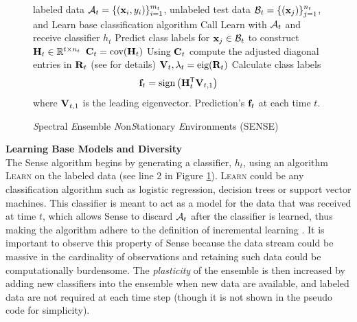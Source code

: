 \documentclass[10pt, conference]{IEEEtran}
\begin{document}
\begin{figure}
  \centering
  \begin{framed}\small
    \begin{algorithmic}[1]
      \INPUT labeled data ${\mathcal A}_t=\{\left({\mathbf x}_i,y_i\right)\}_{i=1}^{m_t}$,
        unlabeled test data ${\mathcal B}_t=\{\left({\mathbf x}_j\right)\}_{j=1}^{n_t}$, and 
        {\sc Learn} base classification algorithm
      \vspace{1em}
	    \STATE Call {\sc Learn} with ${\mathcal A}_t$ and receive classifier  $h_t$
        \STATE Predict class labels for ${\mathbf x}_j\in{\mathcal B}_t$ to construct ${\mathbf H}_t \in {\mathbb R}^{t \times n_t}$
        \STATE ${\mathbf C}_t = \textrm{cov}({\mathbf H}_t)$
        \STATE Using ${\mathbf C}_t$  compute the adjusted diagonal entries in ${\mathbf R}_t$ (see \cite{Parisi2014PNAS} for details)
        \STATE ${\mathbf V}_t,\lambda_t = \textrm{eig}({\mathbf R}_t)$
        \STATE Calculate class labels 
          \begin{equation}
            \label{eq:weight votes}
            \fbf_t = \textrm{sign}\left(\Hbf_t^\T\Vbf_{t,1}\right)
          \end{equation}
          where ${\mathbf V}_{t,1}$ is the leading eigenvector. 
	  \ENDFOR
	  \OUTPUT Prediction's ${\mathbf f}_t$ at each time $t$.
    \end{algorithmic}
  \end{framed}
  \caption{{\em S}pectral {\em E}nsemble {\em N}on{\em S}tationary {\em E}nvironments (SENSE)}
  \label{alg:transe}
\end{figure}

{\bf\noindent Learning Base Models and Diversity}\\
The Sense algorithm begins by generating a classifier, $h_t$, using an algorithm \textsc{Learn} on the labeled data (see line 2 in Figure \ref{alg:transe}). \textsc{Learn} could be any classification algorithm such as logistic regression, decision trees or support vector machines. This classifier is meant to act as a model for the data that was received at time $t$, which allows Sense to discard ${\mathcal A}_t$ after the classifier is learned, thus making the algorithm adhere to the definition of incremental learning \cite{Polikar2001TSMC}. It is important to observe this property of Sense because the data stream could be massive in the cardinality of observations and retaining such data could be computationally burdensome. The   {\em plasticity} of the ensemble is then increased by adding new classifiers into the ensemble when new data are available, and  labeled data are not required at each time step (though it is not shown in the pseudo code for simplicity). 
\end{document}
